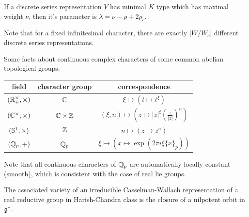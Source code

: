 If a discrete series representation $V$ has minimal $K$ type which has maximal weight $\nu$, then it's parameter is $\lambda = \nu -\rho + 2\rho_c $.

Note that for a fixed infinitesimal character, there are exactly $|W/W_c|$ different discrete series representations.



\label{5}
Some facts about continuous complex characters of some common abelian topological groups:

\begin{tabular}{|c|c|c|}
  \hline
  field            & character group & correspondence                                \\
  \hline
  $(\mathbb{R}^\times_+,\times)$        & $\mathbb{C}$           & $\xi \mapsto (t \mapsto t^\xi)$ \\
  \hline
  $(\mathbb{C}^\times,\times) $ &    $\mathbb{C} \times \mathbb{Z}$             & $(\xi,n) \mapsto (z \mapsto |z|^\xi (\frac{z}{|z|})^n)$                                              \\
  \hline
  $(\mathbb{S}^1,\times)$          &  $\mathbb{Z}$               & $n \mapsto (z \mapsto z^n)$                                              \\
  \hline
  $(\mathbb{Q}_p,+)$          & $\mathbb{Q}_p$                 &  $\xi \mapsto (x \mapsto \exp(2\pi i \xi \{ x \}_p))$                                             \\
  \hline
\end{tabular}

\begin{rk}
  Note that all continuous characters of $\mathbb{Q}_p$ are automatically locally constant (smooth), which is consistent with the case of real lie groups. 
\end{rk}




\begin{lem}
  The associated variety of an irreducible Casselman-Wallach representation of a real reductive group in Harish-Chandra class is the closure of a nilpotent orbit in $\mathfrak{g}^*$.
\end{lem}

